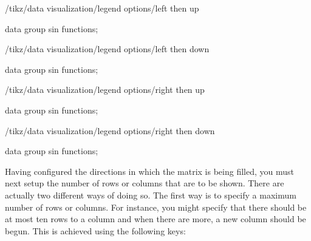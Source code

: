 \begin{key}{/tikz/data visualization/legend options/left then up}
\begin{codeexample}[width=6cm]
\tikz \datavisualization [
  visualize as smooth line/.list={1,2,3,4,5,6,7,8},
  legend example, style sheet=vary hue,
  main legend={left then up, columns=3}]
data group {sin functions};
\end{codeexample}
\end{key}

\begin{key}{/tikz/data visualization/legend options/left then down}
\begin{codeexample}[width=6cm]
\tikz \datavisualization [
  visualize as smooth line/.list={1,2,3,4,5,6,7,8},
  legend example, style sheet=vary hue,
  main legend={left then down, columns=3}]
data group {sin functions};
\end{codeexample}
\end{key}

\begin{key}{/tikz/data visualization/legend options/right then up}
\begin{codeexample}[width=6cm]
\tikz \datavisualization [
  visualize as smooth line/.list={1,2,3,4,5,6,7,8},
  legend example, style sheet=vary hue,
  main legend={right then up, columns=3}]
data group {sin functions};
\end{codeexample}
\end{key}

\begin{key}{/tikz/data visualization/legend options/right then down}
\begin{codeexample}[width=6cm]
\tikz \datavisualization [
  visualize as smooth line/.list={1,2,3,4,5,6,7,8},
  legend example, style sheet=vary hue,
  main legend={right then down, columns=3}]
data group {sin functions};
\end{codeexample}
\end{key}

Having configured the directions in which the matrix is being filled, you must
next setup the number of rows or columns that are to be shown. There are
actually two different ways of doing so. The first way is to specify a maximum
number of rows or columns. For instance, you might specify that there should be
at most ten rows to a column and when there are more, a new column should be
begun. This is achieved using the following keys:

